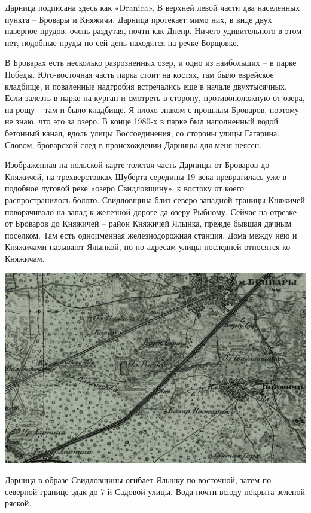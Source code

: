 Дарница подписана здесь как «Dranica». В верхней левой части два населенных пункта – Бровары и Княжичи. Дарница протекает мимо них, в виде двух наверное прудов, очень раздутая, почти как Днепр. Ничего удивительного в этом нет, подобные пруды по сей день находятся на речке Борщовке.

В Броварах есть несколько разрозненных озер, и одно из наибольших – в парке Победы. Юго-восточная часть парка стоит на костях, там было еврейское кладбище, и поваленные надгробия встречались еще в начале двухтысячных. Если залезть в парке на курган и смотреть в сторону, противоположную от озера, на рощу – там и было кладбище. Я плохо знаком с прошлым Броваров, поэтому не знаю, что это за озеро. В конце 1980-х в парке был наполненный водой бетонный канал, вдоль улицы Воссоединения, со стороны улицы Гагарина. Словом, броварской след в происхождении Дарницы для меня неясен.

Изображенная на польской карте толстая часть Дарницы от Броваров до Княжичей, на трехверстовках Шуберта середины 19 века превратилась уже в подобное луговой реке «озеро Свидловщину», к востоку от коего распространилось болото. Свидловщина близ северо-западной границы Княжичей поворачивало на запад к железной дороге да озеру Рыбному. Сейчас на отрезке от Броваров до Княжичей – район Княжичей Ялынка, прежде бывшая дачным поселком. Там есть одноименная железнодорожная станция. Дома между нею и Княжичами называют Ялынкой, но по адресам улицы последней относятся ко Княжичам.

\begin{center}
\includegraphics[width=\linewidth]{chast-gorodki/darn/s_1850-darn.jpg}
\end{center}

Дарница в образе Свидловщины огибает Ялынку по восточной, затем по северной границе эдак до 7-й Садовой улицы. Вода почти всюду покрыта зеленой ряской.

